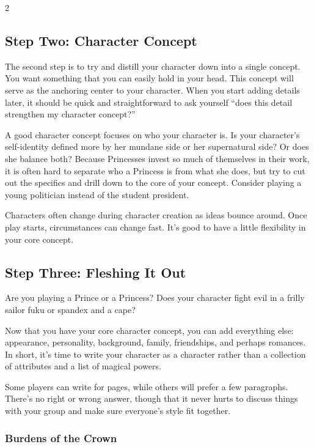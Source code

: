 \begin{multicols}{2}
\subsection*{Step Two: Character Concept}

The second step is to try and distill your character down into a single concept. You want something that you can easily hold in your head. This concept will serve as the anchoring center to your character. When you start adding details later, it should be quick and straightforward to ask yourself \textquotedblleft does this detail strengthen my character concept?\textquotedblright 

A good character concept focuses on who your character is. Is your character's self-identity defined more by her mundane side or her supernatural side? Or does she balance both? Because Princesses invest so much of themselves in their work, it is often hard to separate who a Princess is from what she does, but try to cut out the specifics and drill down to the core of your concept. Consider playing a young politician instead of the student president.  

Characters often change during character creation as ideas bounce around. Once play starts, circumstances can change fast. It's good to have a little flexibility in your core concept. 

\subsection*{Step Three: Fleshing It Out}

Are you playing a Prince or a Princess? Does your character fight evil in a frilly sailor fuku or spandex and a cape? 

Now that you have your core character concept, you can add everything else: appearance, personality, background, family, friendships, and perhaps romances. In short, it's time to write your character as a character rather than a collection of attributes and a list of magical powers. 

Some players can write for pages, while others will prefer a few paragraphs. There's no right or wrong answer, though that it never hurts to discuss things with your group and make sure everyone's style fit together.  


\begin{mybox}


\subsubsection*{Burdens of the Crown}


\end{mybox}
\end{multicols}
